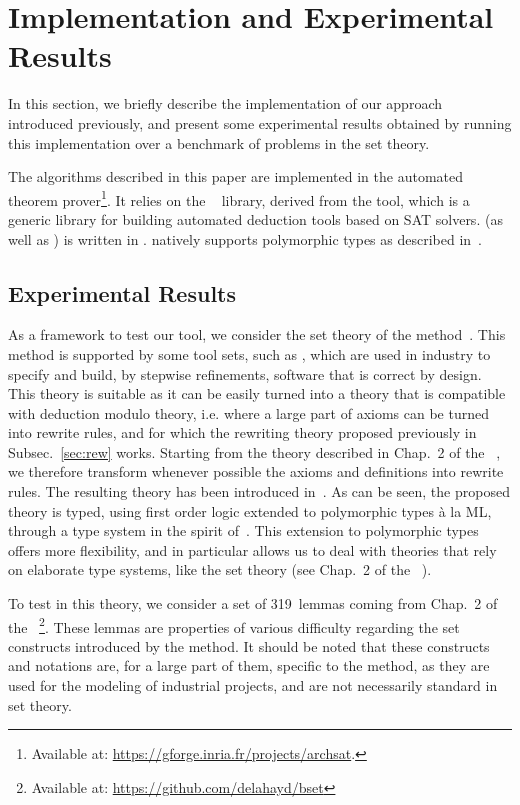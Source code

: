 
\section{Implementation and Experimental Results}
\label{sec:bench}

In this section, we briefly describe the implementation of our approach
introduced previously, and present some experimental results obtained by running
this implementation over a benchmark of problems in the \bmth{} set theory.

The algorithms described in this paper are implemented in the \archsat{}
automated theorem prover\footnote{Available at:
\url{https://gforge.inria.fr/projects/archsat}.}. It relies on the
\msat{}~\cite{GB17} library, derived from the \altergoz{} tool, which is a
generic library for building automated deduction tools based on SAT solvers.
\archsat{} (as well as \msat{}) is written in \ocaml{}. \archsat{} natively
supports polymorphic types as described in~\cite{BP13}.

\subsection{Experimental Results}

As a framework to test our tool, we consider the set theory of the \bmth{}
method~\cite{B-Book}. This method is supported by some tool sets, such as
\atelierb{}, which are used in industry to specify and build, by stepwise
refinements, software that is correct by design. This theory is suitable as it
can be easily turned into a theory that is compatible with deduction modulo
theory, i.e. where a large part of axioms can be turned into rewrite rules, and
for which the rewriting theory proposed previously in Subsec.~\ref{sec:rew}
works. Starting from the theory described in Chap.~2 of the
\bbook{}~\cite{B-Book}, we therefore transform whenever possible the axioms and
definitions into rewrite rules. The resulting theory has been introduced
in~\cite{BA15}. As can be seen, the proposed theory is typed, using first order
logic extended to polymorphic types à la ML, through a type system in the spirit
of~\cite{BP13}. This extension to polymorphic types offers more flexibility, and
in particular allows us to deal with theories that rely on elaborate type
systems, like the \bmth{} set theory (see Chap.~2 of the
\bbook{}~\cite{B-Book}).

To test \archsat{} in this theory, we consider a set of 319~lemmas coming from
Chap.~2 of the \bbook{}~\cite{B-Book}\footnote{Available at:
\url{https://github.com/delahayd/bset}}.  These lemmas are properties of
various difficulty regarding the set constructs introduced by the \bmth{}
method. It should be noted that these constructs and notations are, for a large
part of them, specific to the \bmth{} method, as they are used for the modeling
of industrial projects, and are not necessarily standard in set theory.

